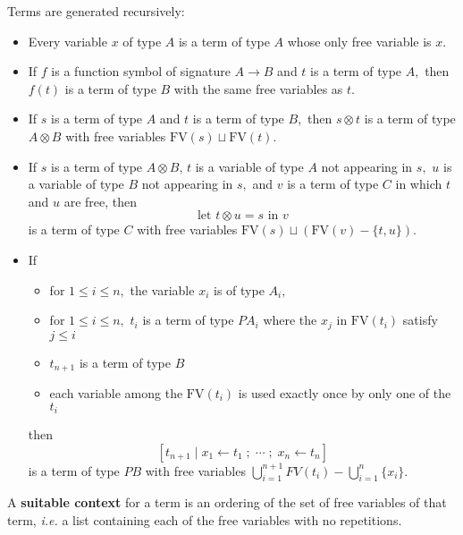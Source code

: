 \documentclass{article}
\newcommand{\FV}{\mbox{FV}}
\begin{document}
Terms are generated recursively:
\begin{itemize}
  \item Every variable $x$ of type $A$ is a term of type $A$ whose only free variable is $x.$
  \item If $f$ is a function symbol of signature $A \to B$ and $t$ is a term of type $A,$ then $f(t)$ is a term of type $B$ with the same free variables as $t.$
  \item If $s$ is a term of type $A$ and $t$ is a term of type $B,$ then $s \otimes t$ is a term of type $A\otimes B$ with free variables $\FV(s) \sqcup \FV(t).$
  \item If $s$ is a term of type $A\otimes B$, $t$ is a variable of type $A$ not appearing in $s,$ $u$ is a variable of type $B$ not appearing in $s,$ and $v$ is a term of type $C$ in which $t$ and $u$ are free, then 
    \[\mbox{let }t \otimes u = s \mbox{ in } v\]
    is a term of type $C$ with free variables $\FV(s) \sqcup (\FV(v) - \{ t, u\}).$
  \item If 
    \begin{itemize}
      \item for $1 \le i \le n,$ the variable $x_i$ is of type $A_i,$
      \item for $1 \le i \le n,$ $t_i$ is a term of type $PA_i$ where the $x_j$ in $\FV(t_i)$ satisfy $j \le i$
      \item $t_{n+1}$ is a term of type $B$
      \item each variable among the $\FV(t_i)$ is used exactly once by only one of the $t_i$
    \end{itemize}
    then 
      \[ [t_{n+1} \; |\; x_1 \leftarrow t_1 \;;\; \cdots \;;\; x_n \leftarrow t_n] \]
    is a term of type $PB$ with free variables $\bigcup_{i=1}^{n+1} FV(t_i) - \bigcup_{i=1}^{n} \{ x_i \}.$
\end{itemize}

A {\bf suitable context} for a term is an ordering of the set of free variables of that term, {\em i.e.} a list containing each of the free variables with no repetitions.
\end{document}
